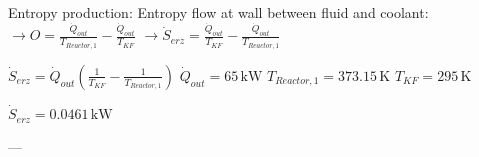 Entropy production:  
Entropy flow at wall between fluid and coolant:  
\( \rightarrow O = \frac{\dot{Q}_{out}}{T_{Reactor,1}} - \frac{\dot{Q}_{out}}{T_{KF}} \)  
\( \rightarrow \dot{S}_{erz} = \frac{\dot{Q}_{out}}{T_{KF}} - \frac{\dot{Q}_{out}}{T_{Reactor,1}} \)  

\( \dot{S}_{erz} = \dot{Q}_{out} \left( \frac{1}{T_{KF}} - \frac{1}{T_{Reactor,1}} \right) \)  
\( \dot{Q}_{out} = 65 \, \text{kW} \)  
\( T_{Reactor,1} = 373.15 \, \text{K} \)  
\( T_{KF} = 295 \, \text{K} \)  

\( \dot{S}_{erz} = 0.0461 \, \text{kW} \)  

---
